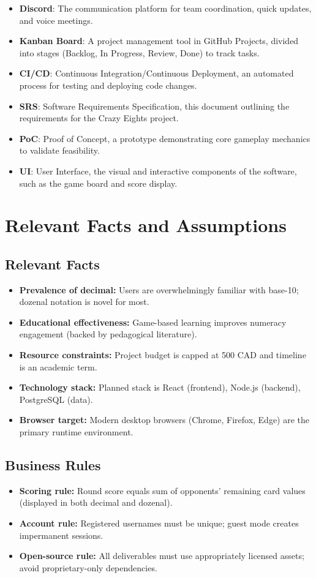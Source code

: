 \documentclass[12pt]{article}
\begin{document}
\begin{itemize}
    \item \textbf{Discord}: The communication platform for team coordination, quick updates, and voice meetings.
    \item \textbf{Kanban Board}: A project management tool in GitHub Projects, divided into stages (Backlog, In Progress, Review, Done) to track tasks.
    \item \textbf{CI/CD}: Continuous Integration/Continuous Deployment, an automated process for testing and deploying code changes.
    \item \textbf{SRS}: Software Requirements Specification, this document outlining the requirements for the Crazy Eights project.
    \item \textbf{PoC}: Proof of Concept, a prototype demonstrating core gameplay mechanics to validate feasibility.
    \item \textbf{UI}: User Interface, the visual and interactive components of the software, such as the game board and score display.
\end{itemize}

\section{Relevant Facts and Assumptions}

\subsection{Relevant Facts}
\begin{itemize}
  \item \textbf{Prevalence of decimal:} Users are overwhelmingly familiar with base-10; dozenal notation is novel for most.
  \item \textbf{Educational effectiveness:} Game-based learning improves numeracy engagement (backed by pedagogical literature).
  \item \textbf{Resource constraints:} Project budget is capped at 500 CAD and timeline is an academic term.
  \item \textbf{Technology stack:} Planned stack is React (frontend), Node.js (backend), PostgreSQL (data).
  \item \textbf{Browser target:} Modern desktop browsers (Chrome, Firefox, Edge) are the primary runtime environment.
\end{itemize}

\subsection{Business Rules}
\begin{itemize}
  \item \textbf{Scoring rule:} Round score equals sum of opponents' remaining card values (displayed in both decimal and dozenal).
  \item \textbf{Account rule:} Registered usernames must be unique; guest mode creates impermanent sessions.
  \item \textbf{Open-source rule:} All deliverables must use appropriately licensed assets; avoid proprietary-only dependencies.
\end{itemize}
\end{document}
